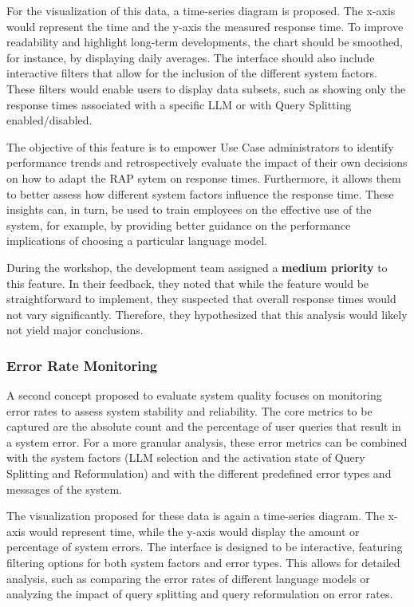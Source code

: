 \documentclass[
	english,
	ruledheaders=section,%
	class=report,%
	thesis={type=bachelor},%
	accentcolor=1b,%
	custommargins=true,%
	marginpar=false,%
	parskip=half-,%
	fontsize=11pt,%
	DIV=14,
]{tudapub}
\begin{document}
For the visualization of this data, a time-series diagram is proposed. The x-axis would represent the time and the y-axis the measured response time. To improve readability and highlight long-term developments, the chart should be smoothed, for instance, by displaying daily averages. The interface should also include interactive filters that allow for the inclusion of the different system factors. These filters would enable users to display data subsets, such as showing only the response times associated with a specific LLM or with Query Splitting enabled/disabled.

The objective of this feature is to empower Use Case administrators to identify performance trends and retrospectively evaluate the impact of their own decisions on how to adapt the RAP sytem on response times. Furthermore, it allows them to better assess how different system factors influence the response time. These insights can, in turn, be used to train employees on the effective use of the system, for example, by providing better guidance on the performance implications of choosing a particular language model.

During the workshop, the development team assigned a \textbf{medium priority} to this feature. In their feedback, they noted that while the feature would be straightforward to implement, they suspected that overall response times would not vary significantly. Therefore, they hypothesized that this analysis would likely not yield major conclusions.

\subsubsection{Error Rate Monitoring}
A second concept proposed to evaluate system quality focuses on monitoring error rates to assess system stability and reliability. The core metrics to be captured are the absolute count and the percentage of user queries that result in a system error. For a more granular analysis, these error metrics can be combined with the system factors (LLM selection and the activation state of Query Splitting and Reformulation) and with the different predefined error types and messages of the system.

The visualization proposed for these data is again a time-series diagram. The x-axis would represent time, while the y-axis would display the amount or percentage of system errors. The interface is designed to be interactive, featuring filtering options for both system factors and error types. This allows for detailed analysis, such as comparing the error rates of different language models or analyzing the impact of query splitting and query reformulation on error rates.
\end{document}
